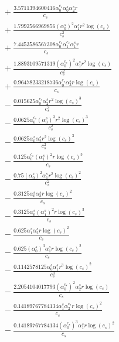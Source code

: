 \documentclass[10pt]{article}
\begin{document}
\begin{align*}
&{}  + \frac{3.5711394600416 \alpha_{0}^{c_s} \alpha_{0}^s \alpha_{2}^s r}{c_{s}} \\
&{}  + \frac{1.7992566969856 \left(\alpha_{0}^s\right)^{2} \alpha_{1}^s r^{2} \log{\left(c_{s} \right)}}{c_{s}^{2}} \\
&{}  + \frac{7.4453586567308 \alpha_{0}^{c_s} \alpha_{1}^{c_s} \alpha_{1}^s r}{c_{s}} \\
&{}  + \frac{1.8893109571319 \left(\alpha_{0}^{c_s}\right)^{2} \alpha_{1}^s r^{2} \log{\left(c_{s} \right)}}{c_{s}^{2}} \\
&{}  + \frac{0.96478233218736 \alpha_{0}^{c_s} \alpha_{3}^s r \log{\left(c_{s} \right)}}{c_{s}} \\
&{}  - \frac{0.015625 \alpha_{0}^{c_s} \alpha_{2}^s r^{2} \log{\left(c_{s} \right)}^{3}}{c_{s}^{2}} \\
&{}  - \frac{0.0625 \alpha_{0}^{c_s} \left(\alpha_{0}^s\right)^{3} r^{2} \log{\left(c_{s} \right)}^{3}}{c_{s}^{2}} \\
&{}  - \frac{0.0625 \alpha_{0}^s \alpha_{2}^s r^{2} \log{\left(c_{s} \right)}^{3}}{c_{s}^{2}} \\
&{}  - \frac{0.125 \alpha_{0}^{c_s} \left(\alpha_{1}^s\right)^{2} r \log{\left(c_{s} \right)}^{3}}{c_{s}} \\
&{}  - \frac{0.75 \left(\alpha_{0}^s\right)^{2} \alpha_{1}^s r^{2} \log{\left(c_{s} \right)}^{2}}{c_{s}^{2}} \\
&{}  - \frac{0.3125 \alpha_{0}^s \alpha_{3}^s r \log{\left(c_{s} \right)}^{2}}{c_{s}} \\
&{}  - \frac{0.3125 \alpha_{0}^s \left(\alpha_{1}^s\right)^{2} r \log{\left(c_{s} \right)}^{3}}{c_{s}} \\
&{}  - \frac{0.625 \alpha_{1}^s \alpha_{2}^s r \log{\left(c_{s} \right)}^{2}}{c_{s}} \\
&{}  - \frac{0.625 \left(\alpha_{0}^s\right)^{3} \alpha_{1}^s r \log{\left(c_{s} \right)}^{2}}{c_{s}} \\
&{}  - \frac{0.1142578125 \alpha_{0}^s \alpha_{1}^s r^{3} \log{\left(c_{s} \right)}^{2}}{c_{s}^{3}} \\
&{}  - \frac{2.2054104017793 \left(\alpha_{0}^{c_s}\right)^{2} \alpha_{2}^s r \log{\left(c_{s} \right)}}{c_{s}} \\
&{}  - \frac{0.14189767784134 \alpha_{1}^s \alpha_{2}^{c_s} r \log{\left(c_{s} \right)}^{2}}{c_{s}} \\
&{}  - \frac{0.14189767784134 \left(\alpha_{0}^{c_s}\right)^{3} \alpha_{1}^s r \log{\left(c_{s} \right)}^{2}}{c_{s}} \\

\end{align*}
\end{document}
